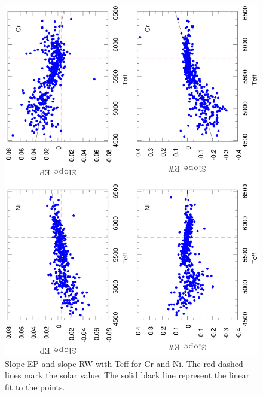 \documentclass[dvips,12pt,a4paper]{report}
\begin{document}
{{\begin{figure}[h]
\centering
\includegraphics[width= 10 cm, angle=-90]{pics/uncertain/teff.eps}
\caption[Slope EP and slope RW with Teff for Cr and Ni]{Slope EP and slope RW with Teff for Cr and Ni. The red dashed lines mark the solar value. The solid black line represent the linear fit to the points.}
\label{slopeteff}
\end{figure}

}}
\end{document}
